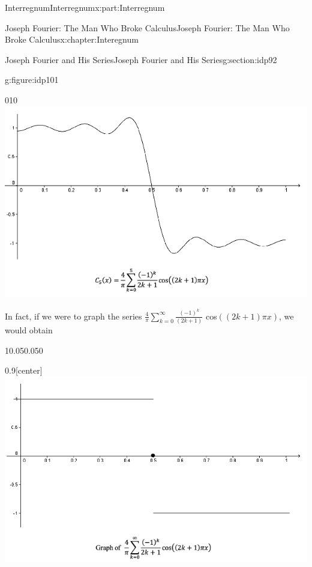 \documentclass[oneside,10pt,]{book}
\numberwithin{equation}{section}
\begin{document}
\begin{partptx}{Interregnum}{}{Interregnum}{}{}{x:part:Interregnum}
\begin{chapterptx}{Joseph Fourier: The Man Who Broke Calculus}{}{Joseph Fourier: The Man Who Broke Calculus}{}{}{x:chapter:Interegnum}
\begin{sectionptx}{Joseph Fourier and His Series}{}{Joseph Fourier and His Series}{}{}{g:section:idp92}
\begin{figureptx}{}{g:figure:idp101}{}
\begin{image}{0}{1}{0}
\includegraphics[width=\linewidth]{images/FourierEx8.png}
\end{image}%
\tcblower
\end{figureptx}%
In fact, if we were to graph the series \(\frac{4}{\pi}\sum_{k=0}^\infty\frac{\left(-1\right)^k}{\left(2k+1\right)}\) cos\(\left(\left(2k+1\right)\pi x\right)\), we would obtain%
\begin{sidebyside}{1}{0.05}{0.05}{0}%
\begin{sbspanel}{0.9}[center]%
\includegraphics[width=\linewidth]{images/FourierEx10.png}
\end{sbspanel}%
\end{sidebyside}%
\par

\end{sectionptx}
\end{chapterptx}
\end{partptx}
\end{document}
